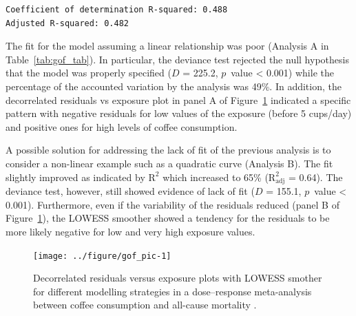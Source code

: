 \documentclass[11pt,a4paper,twoside,openany]{book}\usepackage{knitr}
\begin{document}
{{\begin{knitrout}
\begin{kframe}
\begin{verbatim}
Coefficient of determination R-squared: 0.488 
Adjusted R-squared: 0.482
\end{verbatim}
\end{kframe}
\end{knitrout}

\noindent The fit for the model assuming a linear relationship was poor (Analysis A in Table~\ref{tab:gof_tab}). In particular, the deviance test rejected the null hypothesis that the model was properly specified ($D$ = 225.2, $p$~value < 0.001) while the percentage of the accounted variation by the analysis was 49\%. In addition, the decorrelated residuals vs exposure plot in panel A of Figure~\ref{fig:gof_pic} indicated a specific pattern with negative residuals for low values of the exposure (before 5 cups/day) and positive ones for high levels of coffee consumption.

\noindent A possible solution for addressing the lack of fit of the previous analysis is to consider a non-linear example such as a quadratic curve (Analysis B). The fit slightly improved as indicated by \textrm{$\mathrm{R^2}$} which increased to 65\% (\textrm{$\mathrm{R_{\textrm{adj}}^2}$} = 0.64). The deviance test, however, still showed evidence of lack of fit ($D$ = 155.1, $p$~value < 0.001). Furthermore, even if the variability of the residuals reduced (panel B of Figure~\ref{fig:gof_pic}), the LOWESS smoother showed a tendency for the residuals to be more likely negative for low and very high exposure values.

\begin{knitrout}\footnotesize
{}\color{fgcolor}\begin{figure}[ht!]

{\centering \texttt{[image: ../figure/gof\_pic-1]} 

}

\caption[Decorrelated residuals versus exposure plots with LOWESS smother for different modelling strategies in a dose--response meta-analysis between coffee consumption and all-cause mortality \citep{crippa2014coffee}]{Decorrelated residuals versus exposure plots with LOWESS smother for different modelling strategies in a dose--response meta-analysis between coffee consumption and all-cause mortality \citep{crippa2014coffee}.}\label{fig:gof_pic}
\end{figure}


\end{knitrout}

}}
\end{document}
